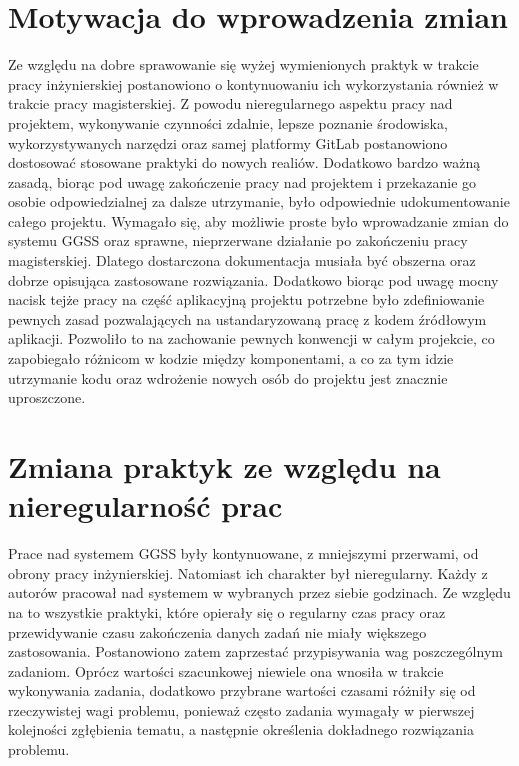 \section{Motywacja do wprowadzenia zmian}
Ze względu na dobre sprawowanie się wyżej wymienionych praktyk w trakcie pracy inżynierskiej postanowiono o kontynuowaniu ich wykorzystania również w trakcie pracy magisterskiej. Z powodu nieregularnego aspektu pracy nad projektem, wykonywanie czynności zdalnie, lepsze poznanie środowiska, wykorzystywanych narzędzi oraz samej platformy GitLab postanowiono dostosować stosowane praktyki do nowych realiów. Dodatkowo bardzo ważną zasadą, biorąc pod uwagę zakończenie pracy nad projektem i przekazanie go osobie odpowiedzialnej za dalsze utrzymanie, było odpowiednie udokumentowanie całego projektu. Wymagało się, aby możliwie proste było wprowadzanie zmian do systemu GGSS oraz sprawne, nieprzerwane działanie po zakończeniu pracy magisterskiej. Dlatego dostarczona dokumentacja musiała być obszerna oraz dobrze opisująca zastosowane rozwiązania. Dodatkowo biorąc pod uwagę mocny nacisk tejże pracy na część aplikacyjną projektu potrzebne było zdefiniowanie pewnych zasad pozwalających na ustandaryzowaną pracę z kodem źródłowym aplikacji. Pozwoliło to na zachowanie pewnych konwencji w całym projekcie, co zapobiegało różnicom w kodzie między komponentami, a co za tym idzie utrzymanie kodu oraz wdrożenie nowych osób do projektu jest znacznie uproszczone.


\section{Zmiana praktyk ze względu na nieregularność prac}

Prace nad systemem GGSS były kontynuowane, z mniejszymi przerwami, od obrony pracy inżynierskiej. Natomiast ich charakter był nieregularny. Każdy z autorów pracował nad systemem w wybranych przez siebie godzinach. Ze względu na to wszystkie praktyki, które opierały się o regularny czas pracy oraz przewidywanie czasu zakończenia danych zadań nie miały większego zastosowania. Postanowiono zatem zaprzestać przypisywania wag poszczególnym zadaniom. Oprócz wartości szacunkowej niewiele ona wnosiła w trakcie wykonywania zadania, dodatkowo przybrane wartości czasami różniły się od rzeczywistej wagi problemu, ponieważ często zadania wymagały w pierwszej kolejności zgłębienia tematu, a następnie określenia dokładnego rozwiązania problemu.

